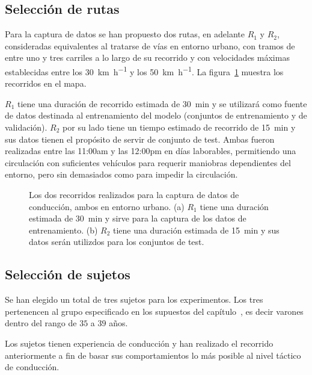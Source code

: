 \subsection{Selección de rutas}

Para la captura de datos se han propuesto dos rutas, en adelante $R_1$ y $R_2$, consideradas equivalentes al tratarse de vías en entorno urbano, con tramos de entre uno y tres carriles a lo largo de su recorrido y con velocidades máximas establecidas entre los \SI{30}{\km\per\hour} y los \SI{50}{\km\per\hour}. La figura~\ref{fig:proposed-routes} muestra los recorridos en el mapa.

$R_1$ tiene una duración de recorrido estimada de \SI{30}{\minute} y se utilizará como fuente de datos destinada al entrenamiento del modelo (conjuntos de entrenamiento y de validación). $R_2$ por su lado tiene un tiempo estimado de recorrido de \SI{15}{\minute} y sus datos tienen el propósito de servir de conjunto de test. Ambas fueron realizadas entre las 11:00am y las 12:00pm en días laborables, permitiendo una circulación con suficientes vehículos para requerir maniobras dependientes del entorno, pero sin demasiados como para impedir la circulación.

\begin{figure}[t]
	\centering
	\qquad
	\caption[Los dos recorridos planteados para la captura de datos de conducción]{Los dos recorridos realizados para la captura de datos de conducción, ambos en entorno urbano. (a) $R_1$ tiene una duración estimada de \SI{30}{\minute} y sirve para la captura de los datos de entrenamiento. (b) $R_2$ tiene una duración estimada de \SI{15}{\minute} y sus datos serán utilizdos para los conjuntos de test.}
	\label{fig:proposed-routes}
\end{figure}

\subsection{Selección de sujetos}

Se han elegido un total de tres sujetos para los experimentos. Los tres pertenencen al grupo especificado en los supuestos del capítulo~, es decir varones dentro del rango de $35$ a $39$ años.

Los sujetos tienen experiencia de conducción y han realizado el recorrido anteriormente a fin de basar sus comportamientos lo más posible al nivel táctico de conducción.

